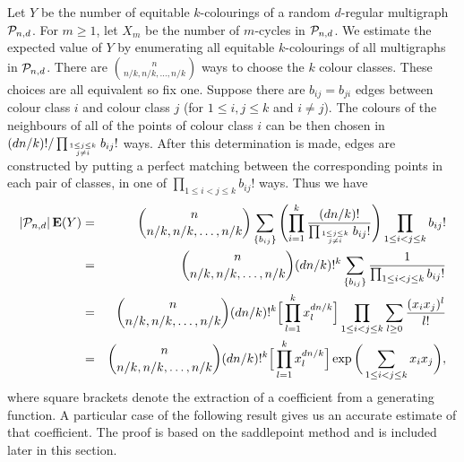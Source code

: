 \documentclass[12pt]{article}
\newtheorem{lemma}[thm]{Lemma}
\def\P{{\cal P}}
\def\ex{{\bf E}}
\def\Pnd{\P_{n,d}}
\begin{document}
Let $Y$ be the number of equitable $k$-colourings of a random $d$-regular
multigraph $\Pnd$. For $m \geq 1$, let $X_m$ be the number of $m$-cycles
in $\Pnd$.
We estimate the expected value of $Y$ by enumerating all equitable
$k$-colourings of all multigraphs in $\Pnd$. There are 
$\binom{n}{n/k, n/k, \ldots, n/k}$ ways
to choose the $k$ colour classes. These choices are all equivalent so 
fix one. Suppose there are $b_{ij}=b_{ji}$ edges between
colour class $i$ and colour class $j$ (for $1\le i,j\le k$ and $i\ne j$). The colours of the
neighbours of all of the points of colour class $i$
can be then chosen in
$(dn/k)!/\prod_{1\le j \le k\atop j\ne i} b_{ij}!$ ways. After this determination
is made, edges are constructed by putting a perfect matching between
the corresponding points in each pair of classes, in one of 
$\prod_{1\le i<j \le k}b_{ij}!$
ways. Thus we have
\begin{eqnarray}
\left| \Pnd \right|
\ex (Y) &=& \binom{n}{n/k, n/k, \ldots, n/k}
\sum_{\{b_{ij}\}}
\left( \prod_{i=1}^k \frac{(dn/k)!}{\prod_{1\le j \le k\atop j\ne i} b_{ij}!} \right)
\prod_{1\le i<j \le k} b_{ij}! \nonumber \\
&=&
\binom{n}{n/k, n/k, \ldots, n/k}
(dn/k)!^k
\sum_{\{b_{ij}\}}
\frac{1}{\prod_{1\le i<j \le k} b_{ij}!} \nonumber \\
&=&
\binom{n}{n/k, n/k, \ldots, n/k}
(dn/k)!^k
\Big[\prod_{l=1}^k x_l^{dn/k}\Big] \prod_{1\le i<j \le k}\sum_{l\geq 0} \frac{(x_i x_j)^l}{l!} \nonumber \\
&=&
\binom{n}{n/k, n/k, \ldots, n/k}
(dn/k)!^k
\Big[\prod_{l=1}^k x_l^{dn/k}\Big] \exp\bigg(\sum_{1\le i<j \le k} x_i x_j\bigg),\nonumber
\end{eqnarray}
where square brackets denote the extraction of a coefficient from a generating function. A particular case of the following result gives us an accurate estimate of that coefficient. The proof is based on the saddlepoint method and is included later in this section.
%
%
\end{document}
